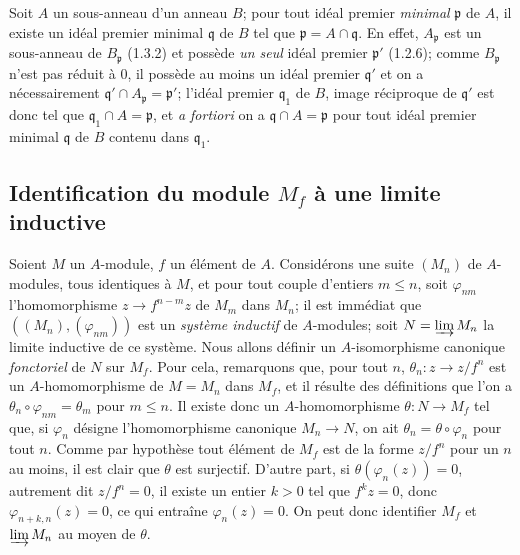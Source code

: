 \begin{env}[1.5.8]
\label{0.1.5.8-fr}
Soit $A$ un sous-anneau d'un anneau $B$; pour tout idéal premier
\emph{minimal} $\mathfrak p$ de $A$, il existe un idéal premier minimal
$\mathfrak q$ de $B$ tel que $\mathfrak p=A\cap\mathfrak q$. En effet,
$A_{\mathfrak p}$ est un sous-anneau de $B_{\mathfrak p}$ (1.3.2) et possède
\emph{un seul} idéal premier $\mathfrak p'$ (1.2.6); comme $B_{\mathfrak p}$ n'est pas
réduit à $0$, il possède au moins un idéal premier $\mathfrak q'$ et on a
nécessairement $\mathfrak q'\cap A_{\mathfrak p}=\mathfrak p'$; l'idéal premier
$\mathfrak q_1$ de $B$, image réciproque de $\mathfrak q'$ est donc tel que
$\mathfrak q_1\cap A=\mathfrak p$, et \emph{a fortiori} on a
$\mathfrak q\cap A=\mathfrak p$ pour tout idéal premier minimal $\mathfrak q$
de $B$ contenu dans $\mathfrak q_1$.
\end{env}

\subsection{Identification du module $M_f$ à une limite inductive}
\label{subsection:0.1.6-fr}

\begin{env}[1.6.1]
\label{0.1.6.1-fr}
Soient $M$ un $A$-module, $f$ un élément de $A$. Considérons une suite
$(M_n)$ de $A$-modules, tous identiques à $M$, et pour tout couple d'entiers
$m\leq n$, soit $\varphi_{nm}$ l'homomorphisme $z\to f^{n-m}z$ de $M_m$
dans $M_n$; il est immédiat que $((M_n),(\varphi_{nm}))$ est un \emph{système
inductif} de $A$-modules; soit $N=\varinjlim M_n$ la limite inductive de ce
système. Nous allons définir un $A$-isomorphisme canonique \emph{fonctoriel} de
$N$ sur $M_f$. Pour cela, remarquons que, pour tout $n$,
$\theta_n:z\to z/f^n$ est un $A$-homomorphisme de $M=M_n$ dans $M_f$, et
il résulte des définitions que l'on a $\theta_n\circ\varphi_{nm}=\theta_m$ pour
$m\leq n$. Il existe donc un $A$-homomorphisme $\theta:N\to M_f$ tel que, si
$\varphi_n$ désigne l'homomorphisme canonique $M_n\to N$, on ait
$\theta_n=\theta\circ\varphi_n$ pour tout $n$. Comme par hypothèse tout élément
de $M_f$ est de la forme $z/f^n$ pour un $n$ au moins, il est clair que
$\theta$ est surjectif. D'autre part, si $\theta(\varphi_n(z))=0$, autrement dit
$z/f^n=0$, il existe un entier $k>0$ tel que $f^kz=0$, donc
$\varphi_{n+k,n}(z)=0$, ce qui entraîne $\varphi_n(z)=0$. On peut donc
identifier $M_f$ et $\varinjlim M_n$ au moyen de $\theta$.
\end{env}

